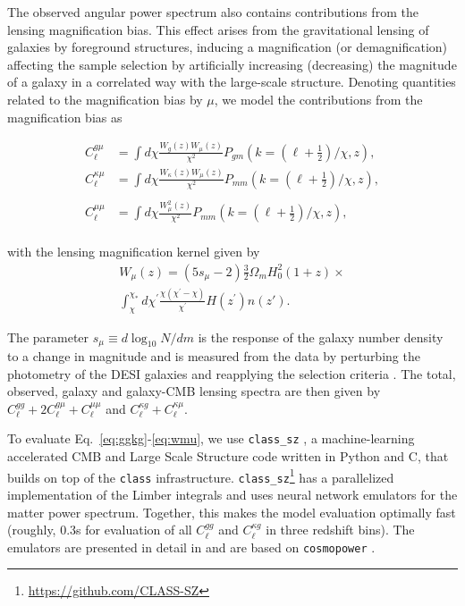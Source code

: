 \documentclass[twocolumn]{aastex631}
\begin{document}
{The observed angular power spectrum also contains contributions from the lensing magnification bias. This effect arises from the gravitational lensing of galaxies by foreground structures, inducing a magnification (or demagnification)
affecting the sample selection by artificially increasing (decreasing) the magnitude of a galaxy in a correlated way with the large-scale structure.
Denoting quantities related to the magnification bias by $\mu$, we model the contributions from the magnification bias as

\begin{align}
    C^{g\mu}_\ell&=\int{d\chi}\frac{W_g(z)W_\mu(z)}{\chi^2}P_{gm}\left(k=\left(\ell+\frac{1}{2}\right)/\chi,z\right),\nonumber\\    C^{\kappa\mu}_\ell&=\int{d\chi}\frac{W_\kappa(z)W_\mu(z)}{\chi^2}P_{mm}\left(k=\left(\ell+\frac{1}{2}\right)/\chi,z\right),\nonumber\\  \nonumber\\  C^{\mu{\mu}}_\ell&=\int{d\chi}\frac{W^2_\mu(z)}{\chi^2}P_{mm}\left(k=\left(\ell+\frac{1}{2}\right)/\chi,z\right),
\end{align}\\
with the lensing magnification kernel given by
\begin{align}
    W_\mu(z)=(5s_\mu-2)\frac{3}{2}\Omega_mH_0^2(1+z)\times \nonumber\\
    \int^{\chi_*}_{\chi}d\chi^\prime\frac{\chi(\chi^\prime-\chi)}{\chi^\prime}H(z^\prime)n(z\prime).\label{eq:wmu}
\end{align}

The parameter $s_\mu\equiv{d\log_{10}N/dm}$ is the response of the galaxy number density to a change in magnitude and is measured from the data by perturbing the photometry of the DESI galaxies and reapplying the selection criteria \citep{hang2021}. The total, observed, galaxy and galaxy-CMB lensing spectra are then given by $C^{gg}_\ell+2C^{g\mu}_\ell+C^{\mu\mu}_\ell$ and 
$C^{\kappa{g}}_\ell+C^{\kappa\mu}_\ell$. 

To evaluate Eq.~\eqref{eq:ggkg}-\eqref{eq:wmu}, we use \texttt{class\_sz} \citep{Bolliet:2017lha,Bolliet:2023eob}, a machine-learning accelerated CMB and Large Scale Structure code written in Python and C, that builds on top of the \texttt{class} \citep{2011arXiv1104.2932L, 2011JCAP...07..034B} infrastructure. \texttt{class\_sz}\footnote{\href{https://github.com/CLASS-SZ}{https://github.com/CLASS-SZ}}  has a parallelized implementation of the Limber integrals and uses neural network emulators for the matter power spectrum. Together, this makes the model evaluation optimally fast (roughly, 0.3s for evaluation of all $C^{gg}_\ell$ and $C^{\kappa g}_\ell$ in three redshift bins). The emulators are presented in detail in \cite{Bolliet:2023sst} and are based on \texttt{cosmopower} \citep{SpurioMancini:2021ppk}.

}
\end{document}
